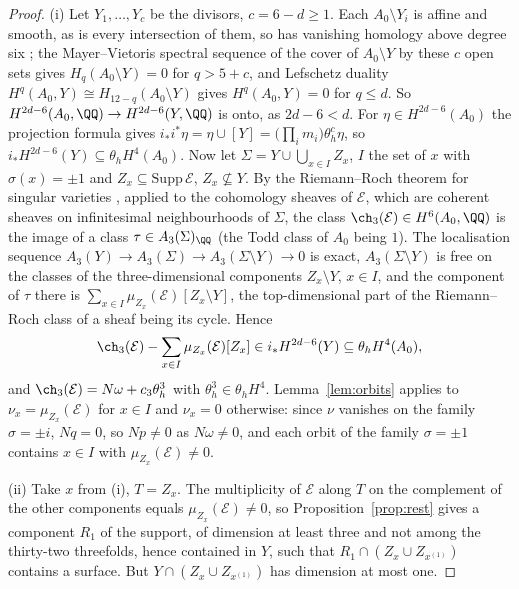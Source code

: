\begin{proof}
(i) Let $Y_{1},\dots,Y_{c}$ be the divisors, $c=6-d\ge1$. Each $A_{0}\setminus Y_{i}$ is affine and smooth, as is every intersection of them, so has vanishing homology above degree six \cite{AF59}; the Mayer--Vietoris spectral sequence of the cover of $A_{0}\setminus Y$ by these $c$ open sets gives $H_{q}(A_{0}\setminus Y)=0$ for $q>5+c$, and Lefschetz duality $H^{q}(A_{0},Y)\cong H_{12-q}(A_{0}\setminus Y)$ gives $H^{q}(A_{0},Y)=0$ for $q\le d$. So $H^{2d-6}(A_{0},\QQ)\to H^{2d-6}(Y,\QQ)$ is onto, as $2d-6<d$. For $\eta\in H^{2d-6}(A_{0})$ the projection formula gives $i_{*}i^{*}\eta=\eta\cup[Y]=\bigl(\prod_{i}m_{i}\bigr)\theta_{h}^{c}\eta$, so $i_{*}H^{2d-6}(Y)\subseteq\theta_{h}H^{4}(A_{0})$. Now let $\Sigma=Y\cup\bigcup_{x\in I}Z_{x}$, $I$ the set of $x$ with $\sigma(x)=\pm1$ and $Z_{x}\subseteq\mathrm{Supp}\,\mathcal{E}$, $Z_{x}\not\subseteq Y$. By the Riemann--Roch theorem for singular varieties \cite[Ch.~18]{Ful98}, applied to the cohomology sheaves of $\mathcal{E}$, which are coherent sheaves on infinitesimal neighbourhoods of $\Sigma$, the class $\ch_{3}(\mathcal{E})\in H^{6}(A_{0},\QQ)$ is the image of a class $\tau\in A_{3}(\Sigma)_{\QQ}$ (the Todd class of $A_{0}$ being $1$). The localisation sequence $A_{3}(Y)\to A_{3}(\Sigma)\to A_{3}(\Sigma\setminus Y)\to0$ is exact, $A_{3}(\Sigma\setminus Y)$ is free on the classes of the three-dimensional components $Z_{x}\setminus Y$, $x\in I$, and the component of $\tau$ there is $\sum_{x\in I}\mu_{Z_{x}}(\mathcal{E})[Z_{x}\setminus Y]$, the top-dimensional part of the Riemann--Roch class of a sheaf being its cycle. Hence
\[
\ch_{3}(\mathcal{E})-\sum_{x\in I}\mu_{Z_{x}}(\mathcal{E})[Z_{x}]\in i_{*}H^{2d-6}(Y)\subseteq\theta_{h}H^{4}(A_{0}),
\]
and $\ch_{3}(\mathcal{E})=N\omega+c_{3}\theta_{h}^{3}$ with $\theta_{h}^{3}\in\theta_{h}H^{4}$. Lemma~\ref{lem:orbits} applies to $\nu_{x}=\mu_{Z_{x}}(\mathcal{E})$ for $x\in I$ and $\nu_{x}=0$ otherwise: since $\nu$ vanishes on the family $\sigma=\pm i$, $Nq=0$, so $Np\ne0$ as $N\omega\ne0$, and each orbit of the family $\sigma=\pm1$ contains $x\in I$ with $\mu_{Z_{x}}(\mathcal{E})\ne0$.

(ii) Take $x$ from (i), $T=Z_{x}$. The multiplicity of $\mathcal{E}$ along $T$ on the complement of the other components equals $\mu_{Z_{x}}(\mathcal{E})\ne0$, so Proposition~\ref{prop:rest} gives a component $R_{1}$ of the support, of dimension at least three and not among the thirty-two threefolds, hence contained in $Y$, such that $R_{1}\cap(Z_{x}\cup Z_{x^{(1)}})$ contains a surface. But $Y\cap(Z_{x}\cup Z_{x^{(1)}})$ has dimension at most one.
\end{proof}

